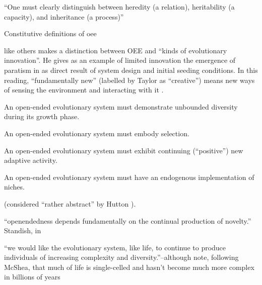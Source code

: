 \begin{NOTES}
	
	``One must clearly distinguish between heredity (a relation), heritability (a capacity), and inheritance (a process)'' \autocite{Griesemer2005}
	
Constitutive definitions of \gls{oee}

\parencite{Taylor2001} like others makes a distinction between OEE and ``kinds of evolutionary innovation''. He gives as an example of limited innovation the emergence of paratism in \cite{Ray1991} as direct result of system design and initial seeding conditions. In this reading, ``fundamentally new'' (labelled by Taylor as ``creative'') means new ways of sensing the environment and interacting with it \cite{Taylor2001}.


\begin{compactitem}
	\item An open-ended evolutionary system must demonstrate unbounded diversity during its growth phase.
	\item An open-ended evolutionary system must embody selection.
	\item An open-ended evolutionary system must exhibit continuing (``positive'') new adaptive activity.
	\item An open-ended evolutionary system must have an endogenous implementation of niches.
\end{compactitem} \cite{Maley1999} (considered ``rather abstract'' by Hutton \parencite[p.341]{Hutton2002}).

``openendedness depends fundamentally on the continual production of novelty.'' Standish, in \parencite{Soros2014}

``we would like the evolutionary system, like life, to continue to produce individuals of increasing complexity and diversity.''--although note, following McShea, that much of life is single-celled and hasn't become much more complex in billions of years \parencite{Maley1999}

\end{NOTES}

